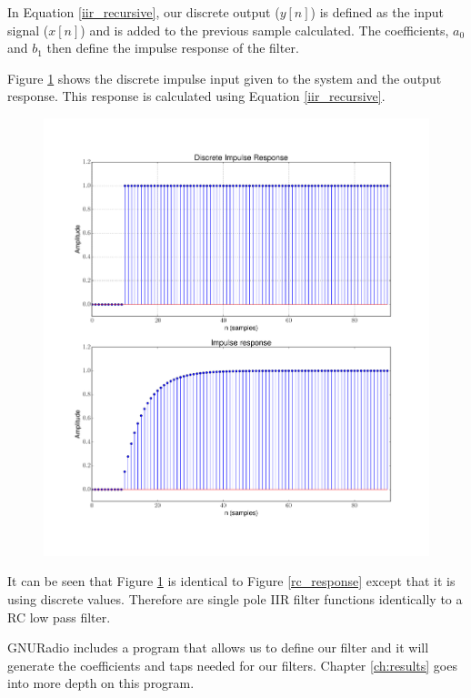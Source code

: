 In Equation \ref{iir_recursive}, our discrete output ($y[n]$) is defined as the input signal ($x[n]$) and is added to the previous sample calculated.  The coefficients, $a_0$ and $b_1$ then define the impulse response of the filter.

Figure \ref{iir_response} shows the discrete impulse input given to the system and the output response.  This response is calculated using Equation \ref{iir_recursive}.

{\begin{figure}[h!tb] 
\centering
\includegraphics[width=17cm]{Experiments/Exp6/iir_response.pdf}
\label{iir_response}
\end{figure}
}

It can be seen that Figure \ref{iir_response} is identical to Figure \ref{rc_response} except that it is using discrete values.  Therefore are single pole IIR filter functions identically to a RC low pass filter.  

GNURadio includes a program that allows us to define our filter and it will generate the coefficients and taps needed for our filters.  Chapter \ref{ch:results} goes into more depth on this program.

